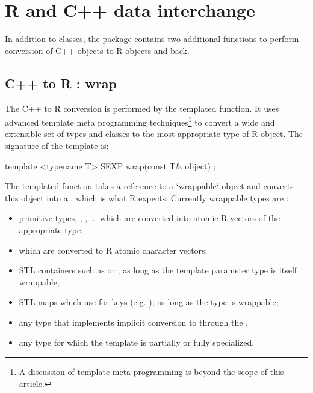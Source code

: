 \section{R and C++ data interchange}

In addition to classes, the  package contains two additional
functions to perform conversion of C++ objects to R objects and back. 

\subsection{C++ to R : wrap}

The C++ to R conversion is performed by the  templated
function. It uses advanced template meta programming techniques\footnote{A
  discussion of template meta programming is beyond the scope of this
  article.}  to convert a wide and extensible set of types and classes to the
most appropriate type of R object. The signature of the  template
is:

\begin{example}
template <typename T> 
SEXP wrap(const T& object) ;
\end{example}

The templated function takes a reference to a `wrappable` 
object and converts this object into a , which is what R expects. 
Currently wrappable types are :
\begin{itemize}
\item primitive types, , , ... which are converted 
into atomic R vectors of the appropriate type;
\item {} which are converted to R atomic character vectors;
\item STL containers such as  or , 
as long as the template parameter type  is itself wrappable;
\item STL maps which use  for keys 
(e.g. ); as long as 
the type  is wrappable;
\item any type that implements implicit conversion to  through the 
.
\item any type for which the  template is partially or fully 
specialized.
\end{itemize}

